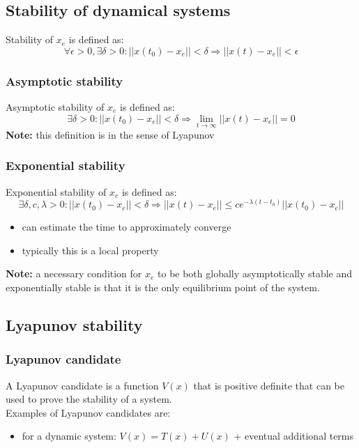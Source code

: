 \documentclass[a4paper,12pt]{article}
\begin{document}
\subsection{Stability of dynamical systems}
Stability of $x_e$ is defined as:
\begin{equation}
\forall \epsilon > 0, \exists \delta > 0 : ||x(t_0)-x_e||<\delta \Rightarrow ||x(t)-x_e||<\epsilon
\end{equation}
\subsubsection{Asymptotic stability}
Asymptotic stability of $x_e$ is defined as:
\begin{equation}
\exists \delta > 0 : ||x(t_0)-x_e||<\delta \Rightarrow \lim_{t \to \infty} ||x(t)-x_e||=0
\end{equation}
\textbf{Note:} this definition is in the sense of Lyapunov
\subsubsection{Exponential stability}
Exponential stability of $x_e$ is defined as:
\begin{equation}
    \exists \delta, c, \lambda > 0 : ||x(t_0)-x_e||<\delta \Rightarrow ||x(t)-x_e|| \leq c e^{-\lambda (t-t_0)} ||x(t_0)-x_e||
\end{equation}
\begin{itemize}
\item can estimate the time to approximately converge
\item typically this is a local property
\end{itemize}
\textbf{Note:} a necessary condition for $x_e$ to be both
globally asymptotically stable and exponentially stable is that
it is the only equilibrium point of the system.

\subsection{Lyapunov stability}
\subsubsection{Lyapunov candidate}\label{sec:Lyapunov candidate}
A Lyapunov candidate is a function $V(x)$ that is positive definite
that can be used to prove the stability of a system.\\
Examples of Lyapunov candidates are:
\begin{itemize}
    \item for a dynamic system: $V(x) = T(x) + U(x)$ + eventual 
    additional terms
\end{itemize}
\end{document}
